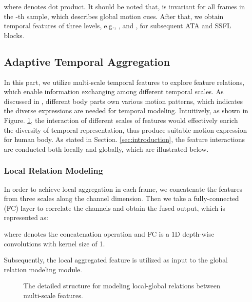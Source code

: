 \documentclass[journal]{IEEEtran}
\begin{document}
\noindent where  denotes dot product. It should be noted that,  is invariant for all frames in the -th sample, which describes global motion cues. After that, we obtain temporal features of three levels, e.g., ,  and , for subsequent ATA and SSFL blocks.
 
 \subsection{Adaptive Temporal Aggregation}
 In this part, we utilize multi-scale temporal features to explore feature relations, which enable information exchanging among different temporal scales. As discussed in \cite{fan2020gaitpart}, different body parts own various motion patterns, which indicates the diverse expressions are needed for temporal modeling. Intuitively, as shown in Figure. \ref{fig:local_global_relation}, the interaction of different scales of features would effectively enrich the diversity of temporal representation, thus produce suitable motion expression for human body. As stated in Section. \ref{sec:introduction}, the feature interactions are conducted both locally and globally, which are illustrated below.
 
 \subsubsection{Local Relation Modeling}




 In order to achieve local aggregation in each frame, we concatenate the features from three scales along the channel dimension. Then we take a fully-connected (FC) layer to correlate the channels and obtain the fused output, which is represented as:
 
 where  denotes the concatenation operation and FC is a 1D depth-wise convolutions with kernel size of 1.
 
Subsequently, the local aggregated feature  is utilized as input to the global relation modeling module.
\begin{figure}[t]
    \centering  {}
    \caption{The detailed structure for modeling local-global relations between multi-scale features.}
    \label{fig:local_global_relation}    \end{figure}
\end{document}
